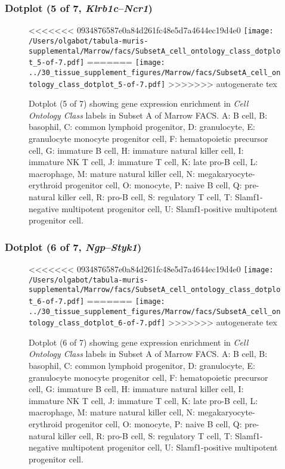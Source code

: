\clearpage

\subsubsection{Dotplot (5 of 7, \emph{Klrb1c}--\emph{Ncr1})}
\begin{figure}[h]
\centering
<<<<<<< 0934876587e0a84d261fc48e5d7a4644ec19d4e0
\texttt{[image: /Users/olgabot/tabula-muris-supplemental/Marrow/facs/SubsetA\_cell\_ontology\_class\_dotplot\_5-of-7.pdf]}
=======
\texttt{[image: ../30\_tissue\_supplement\_figures/Marrow/facs/SubsetA\_cell\_ontology\_class\_dotplot\_5-of-7.pdf]}
>>>>>>> autogenerate tex

\caption{ Dotplot (5 of 7)  showing gene expression enrichment in \emph{Cell Ontology Class} labels in Subset A of Marrow FACS. A: B cell, B: basophil, C: common lymphoid progenitor, D: granulocyte, E: granulocyte monocyte progenitor cell, F: hematopoietic precursor cell, G: immature B cell, H: immature natural killer cell, I: immature NK T cell, J: immature T cell, K: late pro-B cell, L: macrophage, M: mature natural killer cell, N: megakaryocyte-erythroid progenitor cell, O: monocyte, P: naive B cell, Q: pre-natural killer cell, R: pro-B cell, S: regulatory T cell, T: Slamf1-negative multipotent progenitor cell, U: Slamf1-positive multipotent progenitor cell.}
\end{figure}


\clearpage

\subsubsection{Dotplot (6 of 7, \emph{Ngp}--\emph{Styk1})}
\begin{figure}[h]
\centering
<<<<<<< 0934876587e0a84d261fc48e5d7a4644ec19d4e0
\texttt{[image: /Users/olgabot/tabula-muris-supplemental/Marrow/facs/SubsetA\_cell\_ontology\_class\_dotplot\_6-of-7.pdf]}
=======
\texttt{[image: ../30\_tissue\_supplement\_figures/Marrow/facs/SubsetA\_cell\_ontology\_class\_dotplot\_6-of-7.pdf]}
>>>>>>> autogenerate tex

\caption{ Dotplot (6 of 7)  showing gene expression enrichment in \emph{Cell Ontology Class} labels in Subset A of Marrow FACS. A: B cell, B: basophil, C: common lymphoid progenitor, D: granulocyte, E: granulocyte monocyte progenitor cell, F: hematopoietic precursor cell, G: immature B cell, H: immature natural killer cell, I: immature NK T cell, J: immature T cell, K: late pro-B cell, L: macrophage, M: mature natural killer cell, N: megakaryocyte-erythroid progenitor cell, O: monocyte, P: naive B cell, Q: pre-natural killer cell, R: pro-B cell, S: regulatory T cell, T: Slamf1-negative multipotent progenitor cell, U: Slamf1-positive multipotent progenitor cell.}
\end{figure}


